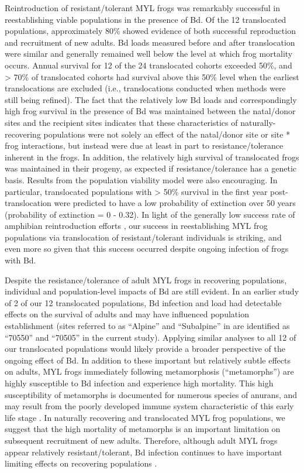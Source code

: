 \documentclass[9pt,twocolumn,twoside,lineno]{pnas-new}
\begin{document}
Reintroduction of resistant/tolerant MYL frogs was remarkably successful
in reestablishing viable populations in the presence of Bd. Of the 12
translocated populations, approximately 80\% showed evidence of both
successful reproduction and recruitment of new adults. Bd loads measured
before and after translocation were similar and generally remained well
below the level at which frog mortality occurs. Annual survival for 12
of the 24 translocated cohorts exceeded 50\%, and \textgreater{} 70\% of
translocated cohorts had survival above this 50\% level when the
earliest translocations are excluded (i.e., translocations conducted
when methods were still being refined). The fact that the relatively low
Bd loads and correspondingly high frog survival in the presence of Bd
was maintained between the natal/donor sites and the recipient sites
indicates that these characteristics of naturally-recovering populations
were not solely an effect of the natal/donor site or site * frog
interactions, but instead were due at least in part to
resistance/tolerance inherent in the frogs. In addition, the relatively
high survival of translocated frogs was maintained in their progeny, as
expected if resistance/tolerance has a genetic basis. Results from the
population viability model were also encouraging. In particular,
translocated populations with \textgreater{} 50\% survival in the first
year post-translocation were predicted to have a low probability of
extinction over 50 years (probability of extinction = 0 - 0.32). In
light of the generally low success rate of amphibian reintroduction
efforts \citep{dodd2005}, our success in reestablishing MYL frog
populations via translocation of resistant/tolerant individuals is
striking, and even more so given that this success occurred despite
ongoing infection of frogs with Bd.

Despite the resistance/tolerance of adult MYL frogs in recovering
populations, individual and population-level impacts of Bd are still
evident. In an earlier study of 2 of our 12 translocated populations, Bd
infection and load had detectable effects on the survival of adults and
may have influenced population establishment (sites referred to as
``Alpine'' and ``Subalpine'' in \citep{joseph2018} are identified as
``70550'' and ``70505'' in the current study). Applying similar analyses
to all 12 of our translocated populations would likely provide a broader
perspective of the ongoing effect of Bd. In addition to these important
but relatively subtle effects on adults, MYL frogs immediately following
metamorphosis (``metamorphs'') are highly susceptible to Bd infection
\citep{ellison2018} and experience high mortality. This high
susceptibility of metamorphs is documented for numerous species of
anurans, and may result from the poorly developed immune system
characteristic of this early life stage \citep{humphries2022}. In
naturally recovering and translocated MYL frog populations, we suggest
that the high mortality of metamorphs is an important limitation on
subsequent recruitment of new adults. Therefore, although adult MYL
frogs appear relatively resistant/tolerant, Bd infection continues to
have important limiting effects on recovering populations \citep[see
also][]{hollanders2022}.
\end{document}
